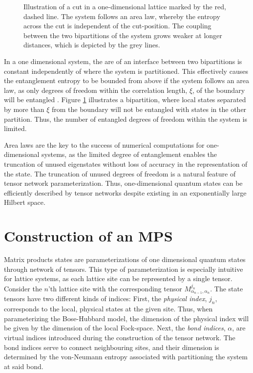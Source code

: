 \begin{figure}[h!]
	\centering
	
	\caption{Illustration of a cut in a one-dimensional lattice marked by the red, dashed line. The system follows an area law, whereby the entropy across the cut is independent of the cut-position. The coupling between the two bipartitions of the system grows weaker at longer distances, which is depicted by the grey lines. }
	\label{fig:LatticeCut}
\end{figure}

In a one dimensional system, the are of an interface between two bipartitions is constant independently of where the system is partitioned. This effectively causes the entanglement entropy to be bounded from above if the system follows an area law, as only degrees of freedom within the correlation length, $\xi$, of the boundary will be entangled \cite{Hastings2007}. Figure \ref{fig:LatticeCut} illustrates a bipartition, where local states separated by more than $\xi$ from the boundary will not be entangled with states in the other partition. Thus, the number of entangled degrees of freedom within the system is limited.

Area laws are the key to the success of numerical computations for one-dimensional systems, as the limited degree of entanglement enables the truncation of unused eigenstates without loss of accuracy in the representation of the state. The truncation of unused degrees of freedom is a natural feature of tensor network parameterization. Thus, one-dimensional quantum states can be efficiently described by tensor networks despite existing in an exponentially large Hilbert space.


\section{Construction of an MPS} \label{sec:construct_MPS}
Matrix products states are parameterizations of one dimensional quantum states through network of tensors.
This type of parameterization is especially intuitive for lattice systems, as each lattice site can be represented by a single tensor.
Consider the $n$'th lattice site with the corresponding tensor $M_{\alpha_{n-1},\alpha_{n}}^{j_n}$. The state tensors have two different kinds of indices: First, the \textit{physical index}, $j_n$, corresponds to the local, physical states at the given site. Thus, when parameterizing the Bose-Hubbard model, the dimension of the physical index will be given by the dimension of the local Fock-space. Next, the \textit{bond indices}, $\alpha$, are virtual indices introduced during the construction of the tensor network. The bond indices serve to connect neighbouring sites, and their dimension is determined by the von-Neumann entropy associated with partitioning the system at said bond.

